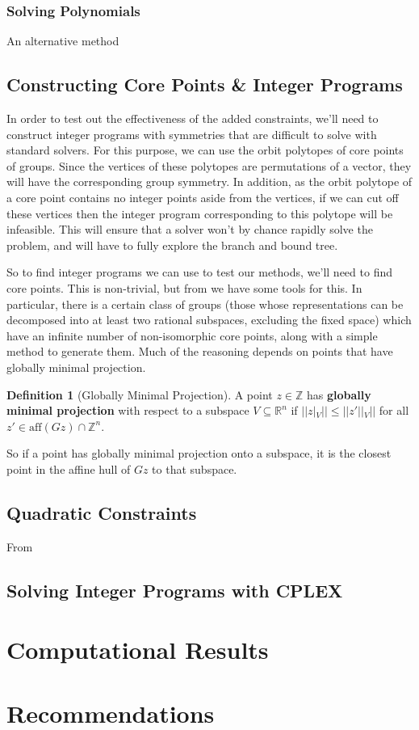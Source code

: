 \documentclass[11pt]{article} %
\theoremstyle{definition}
\newtheorem{definition}[theorem]{Definition}
\theoremstyle{remark}
\newcommand{\ZZ}{\mathbb{Z}}
\begin{document}
\subsubsection{Solving Polynomials}

An alternative method 

\subsection{Constructing Core Points \& Integer Programs}

In order to test out the effectiveness of the added constraints, we'll need to construct integer programs with symmetries that are difficult to solve with standard solvers. For this purpose, we can use the orbit polytopes of core points of groups. Since the vertices of these polytopes are permutations of a vector, they will have the corresponding group symmetry. In addition, as the orbit polytope of a core point contains no integer points aside from the vertices, if we can cut off these vertices then the integer program corresponding to this polytope will be infeasible. This will ensure that a solver won't by chance rapidly solve the problem, and will have to fully explore the branch and bound tree.

So to find integer programs we can use to test our methods, we'll need to find core points. This is non-trivial, but from \cite{rehn} we have some tools for this. In particular, there is a certain class of groups (those whose representations can be decomposed into at least two rational subspaces, excluding the fixed space) which have an infinite number of non-isomorphic core points, along with a simple method to generate them. Much of the reasoning depends on points that have globally minimal projection.

\begin{definition}[Globally Minimal Projection]
A point $z \in \ZZ$ has \textbf{globally minimal projection} with respect to a subspace $V \subseteq \mathbb{R}^n$ if $||z|_V|| \leq ||z'||_V||$ for all $z' \in \textrm{aff}(Gz) \cap \mathbb{Z}^n$.
\end{definition}

So if a point has globally minimal projection onto a subspace, it is the closest point in the affine hull of $Gz$ to that subspace.


\subsection{Quadratic Constraints}

From 

\subsection{Solving Integer Programs with CPLEX}

\section{Computational Results}

\section{Recommendations}
\end{document}
